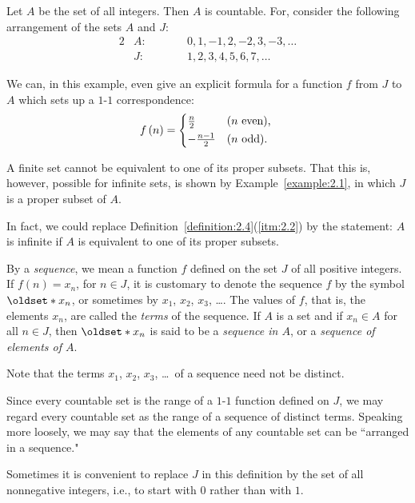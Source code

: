 \begin{example}\label{example:2.1}
    Let \(A\) be the set of all integers. Then \(A\) is countable. For, consider the following arrangement of the sets \(A\) and \(J\):
    \begin{alignat*}{2}
        &A\colon\qquad&&0,1,-1,2,-2,3,-3,\ldots\\
        &J\colon\qquad&&1,2,3,4,5,6,7,\ldots
    \end{alignat*}
\end{example}

We can, in this example, even give an explicit formula for a function \(f\) from \(J\) to \(A\) which sets up a \(1\)-\(1\) correspondence:
\begin{equation*}
    f\left(n\right)=
    \begin{cases*}
        \frac{n}{2} & (\(n\) even), \\
        -\frac{n-1}{2} & (\(n\) odd). \\
    \end{cases*}
\end{equation*}

\begin{remark}
    A finite set cannot be equivalent to one of its proper subsets. That this is, however, possible for infinite sets, is shown by Example~\ref{example:2.1}, in which \(J\) is a proper subset of \(A\).
    
    In fact, we could replace Definition~\ref{definition:2.4}(\ref{itm:2.2}) by the statement: \(A\) is infinite if \(A\) is equivalent to one of its proper subsets.
\end{remark}

\begin{definition}
    By a \emph{sequence}, we mean a function \(f\) defined on the set \(J\) of all positive integers. If \(f\left(n\right)=x_n\), for \(n\in J\), it is customary to denote the sequence \(f\) by the symbol \(\set{x_n}\), or sometimes by \(x_1\), \(x_2\), \(x_3\), \ldots. The values of \(f\), that is, the elements \(x_n\), are called the \emph{terms} of the sequence. If \(A\) is a set and if \(x_n\in A\) for all \(n\in J\), then \(\set{x_n}\) is said to be a \emph{sequence in \(A\)}, or a \emph{sequence of elements of \(A\)}.
    
    Note that the terms \(x_1\), \(x_2\), \(x_3\), \ldots\ of a sequence need not be distinct.
    
    Since every countable set is the range of a \(1\)-\(1\) function defined on \(J\), we may regard every countable set as the range of a sequence of distinct terms. Speaking more loosely, we may say that the elements of any countable set can be ``arranged in a sequence."
    
    Sometimes it is convenient to replace \(J\) in this definition by the set of all nonnegative integers, i.e., to start with \(0\) rather than with \(1\).
\end{definition}

